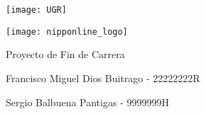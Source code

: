 \begin{center}
\texttt{[image: UGR]}

\vspace{2em}

\texttt{[image: nipponline\_logo]}

{\LARGE\Nipponline{}}

{\large{}Proyecto de Fin de Carrera}


\end{center}

\vspace{14em}
\hfill Francisco Miguel Dios Buitrago - 22222222R

\hfill Sergio Balbuena Pantigas - 9999999H

\thispagestyle{empty}